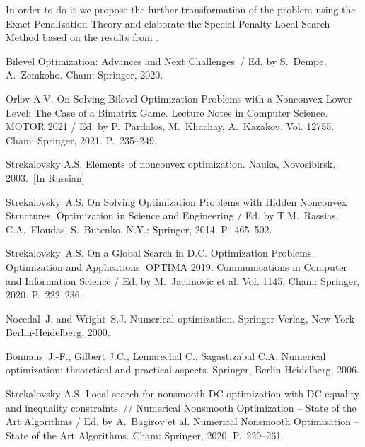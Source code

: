 \documentclass[12pt]{llncs}
\begin{document}
In order to do it we propose the further transformation of the problem using the Exact Penalization Theory \cite{StrekOptima2020,Nocedal,Bonnans} and
elaborate the Special Penalty Local Search Method based on the results from \cite{StrLocNew}.



\begin{thebibliography}{9} %

Bilevel Optimization: Advances and Next Challenges~/ Ed. by S.~Dempe, A.~Zemkoho. Cham: Springer, 2020.

Orlov A.V. On Solving Bilevel Optimization Problems with a Nonconvex Lower Level: The Case of a Bimatrix Game.
Lecture Notes in Computer Science. MOTOR 2021 / Ed. by P.~Pardalos, M.~Khachay, A.~Kazakov. Vol. 12755. Cham: Springer, 2021. P.~235--249.

Strekalovsky A.S. Elements of nonconvex optimization. Nauka, Novosibirsk, 2003.~[In Russian]

Strekalovsky~A.S. On Solving Optimization Problems with Hidden Nonconvex Structures. Optimization
in Science and Engineering / Ed. by T.M.~Rassias, C.A.~Floudas, S.~Butenko. N.Y.: Springer, 2014. P.~465--502.

Strekalovsky~A.S. On a Global Search in D.C. Optimization Problems. Optimization and Applications. OPTIMA 2019. Communications in Computer and Information Science / Ed. by M.~Jacimovic et al. Vol. 1145. Cham: Springer, 2020. P.~222--236.

Nocedal~J. and Wright~S.J.  Numerical optimization. Springer-Verlag, New York-Berlin-Heidelberg, 2000.

Bonnans~J.-F., Gilbert J.C., Lemarechal C., Sagastizabal C.A. Numerical optimization: theoretical
and practical aspects. Springer, Berlin-Heidelberg, 2006.

Strekalovsky A.S. Local search for nonsmooth DC optimization with DC equality and inequality constraints~// Numerical Nonsmooth Optimization -- State of the Art Algorithms / Ed. by A.~Bagirov et al. Numerical Nonsmooth Optimization -- State of the Art Algorithms. Cham: Springer, 2020. P.~229--261.

\end{thebibliography}

\end{document}

